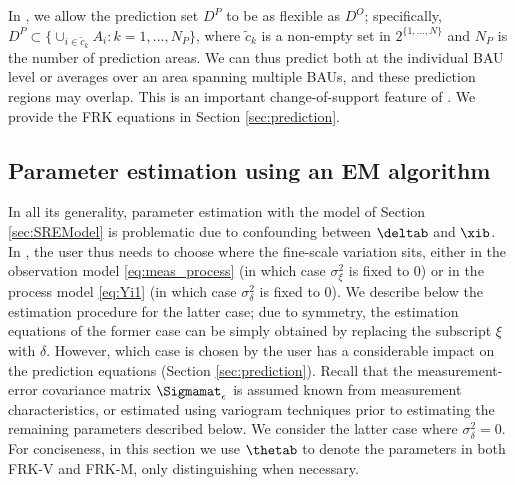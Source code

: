 In , we allow the prediction set $D^P$ to be as flexible as $D^O$; specifically, $D^P \subset \{ \cup_{i \in \tilde{c}_k} A_i : k = 1,\dots,N_P \}$, where $\tilde{c}_k$ is a non-empty set in $2^{\{1,\dots,N\}}$ and $N_P$ is the number of prediction areas. We can thus predict both at the individual BAU level or averages over an area spanning multiple BAUs, and these prediction regions may overlap. This is an important change-of-support feature of . We provide the FRK equations in Section \ref{sec:prediction}.

\subsection{Parameter estimation using an EM algorithm} \label{sec:estimation}

In all its generality, parameter estimation with the model of Section \ref{sec:SREModel} is problematic due to confounding between $\deltab$ and $\xib$. In , the user thus needs to choose where the fine-scale variation sits, either in the observation model \eqref{eq:meas_process} (in which case $\sigma^2_\xi$ is fixed to 0) or in the process model \eqref{eq:Yi1} (in which case $\sigma^2_\delta$ is fixed to 0). We describe below the estimation procedure for the latter case; due to symmetry, the estimation equations of the former case can be simply obtained by replacing the subscript $\xi$ with $\delta$. However, which case is chosen by the user has a considerable impact on the prediction equations (Section \ref{sec:prediction}). Recall that the measurement-error covariance matrix $\Sigmamat_\epsilon$ is assumed known from measurement characteristics, or estimated using variogram techniques prior to estimating the remaining parameters described below. We consider the latter case where $\sigma^2_\delta = 0$. For conciseness, in this section we use $\thetab$ to denote the parameters in both FRK-V and FRK-M, only distinguishing when necessary.

